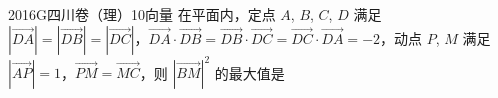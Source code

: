 
\begin{problem}{2016}{G}{四川卷（理）}{10}{向量}
在平面内，定点 $ A $, $ B $, $ C $, $ D $ 满足 $ |\overrightarrow{DA}|=|\overrightarrow{DB}|=|\overrightarrow{DC}| $，$ \overrightarrow{DA}\cdot\overrightarrow{DB}=\overrightarrow{DB}\cdot\overrightarrow{DC}=\overrightarrow{DC}\cdot\overrightarrow{DA}=-2 $，动点 $ P $, $ M $ 满足 $ |\overrightarrow{AP}|=1 $，$ \overrightarrow{PM}=\overrightarrow{MC} $，则 $ \left|\overrightarrow{BM}\right|^2 $ 的最大值是
\begin{choices}
\end{choices}
\end{problem}

\begin{answer}

\end{answer}

\begin{solutions}

\end{solutions}